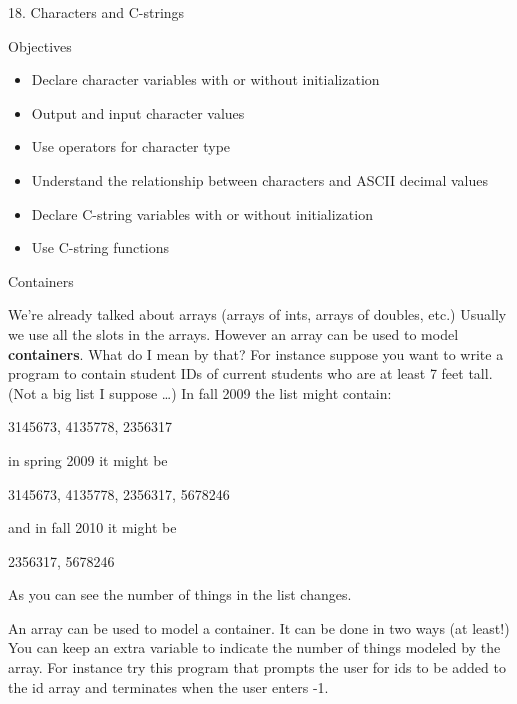 \documentclass[
]{article}
\author{}
\date{}
\providecommand{\tightlist}{%
  \setlength{\itemsep}{0pt}\setlength{\parskip}{0pt}}
\begin{document}
18. Characters and C-strings

Objectives

\begin{itemize}
\tightlist
\item
  Declare character variables with or without initialization
\item
  Output and input character values
\item
  Use operators for character type
\item
  Understand the relationship between characters and ASCII decimal
  values
\item
  Declare C-string variables with or without initialization
\item
  Use C-string functions
\end{itemize}

Containers

We're already talked about arrays (arrays of ints, arrays of doubles,
etc.) Usually we use all the slots in the arrays. However an array can
be used to model \textbf{containers}. What do I mean by that? For
instance suppose you want to write a program to contain student IDs of
current students who are at least 7 feet tall. (Not a big list I suppose
\ldots) In fall 2009 the list might contain:

3145673, 4135778, 2356317

in spring 2009 it might be

3145673, 4135778, 2356317, 5678246

and in fall 2010 it might be

2356317, 5678246

As you can see the number of things in the list changes.

An array can be used to model a container. It can be done in two ways
(at least!) You can keep an extra variable to indicate the number of
things modeled by the array. For instance try this program that prompts
the user for ids to be added to the id array and terminates when the
user enters -1.
\end{document}
